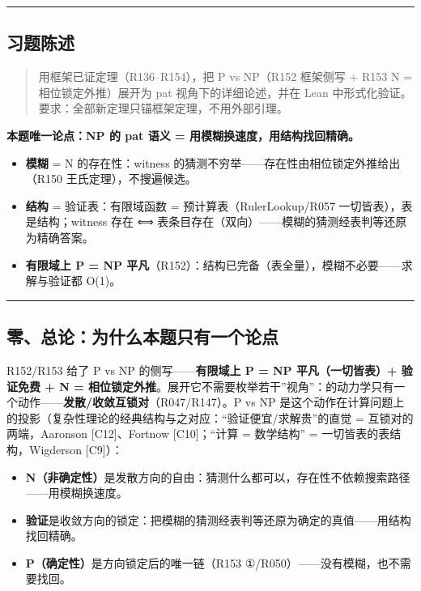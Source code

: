 \documentclass[
]{article}
\providecommand{\tightlist}{%
 \setlength{\itemsep}{0pt}\setlength{\parskip}{0pt}}
\begin{document}
\begin{center}\rule{0.5\linewidth}{0.5pt}\end{center}

\subsection{习题陈述}\label{ux4e60ux9898ux9648ux8ff0}

\begin{quote}
用框架已证定理（R136--R154），把 P vs NP（R152 框架侧写 + R153 N =
相位锁定外推）展开为 pat 视角下的详细论述，并在 Lean
中形式化验证。要求：全部新定理只锚框架定理，不用外部引理。
\end{quote}

\textbf{本题唯一论点：NP 的 pat 语义 = 用模糊换速度，用结构找回精确。}

\begin{itemize}
\tightlist
\item
 \textbf{模糊} = N 的存在性：witness
 的猜测不穷举------存在性由相位锁定外推给出（R150
 王氏定理），不搜遍候选。
\item
 \textbf{结构} = 验证表：有限域函数 = 预计算表（RulerLookup/R057
 一切皆表），表是结构；witness 存在 ⟺
 表条目存在（双向）------模糊的猜测经表判等还原为精确答案。
\item
 \textbf{有限域上 P = NP
 平凡}（R152）：结构已完备（表全量），模糊不必要------求解与验证都
 O(1)。
\end{itemize}

\begin{center}\rule{0.5\linewidth}{0.5pt}\end{center}

\subsection{零、总论：为什么本题只有一个论点}\label{ux96f6ux603bux8bbaux4e3aux4ec0ux4e48ux672cux9898ux53eaux6709ux4e00ux4e2aux8bbaux70b9}

R152/R153 给了 P vs NP 的侧写------\textbf{有限域上 P = NP
平凡（一切皆表）+ 验证免费 + N =
相位锁定外推}。展开它不需要枚举若干''视角''：的动力学只有一个动作------\textbf{发散/收敛互锁对}（R047/R147）。P
vs NP
是这个动作在计算问题上的投影（复杂性理论的经典结构与之对应：``验证便宜/求解贵''的直觉
= 互锁对的两端，Aaronson {[}C12{]}、Fortnow {[}C10{]}；``计算 =
数学结构'' = 一切皆表的表结构，Wigderson {[}C9{]}）：

\begin{itemize}
\tightlist
\item
 \textbf{N（非确定性）}是发散方向的自由：猜测什么都可以，存在性不依赖搜索路径------用模糊换速度。
\item
 \textbf{验证}是收敛方向的锁定：把模糊的猜测经表判等还原为确定的真值------用结构找回精确。
\item
 \textbf{P（确定性）}是方向锁定后的唯一链（R153
 ①/R050）------没有模糊，也不需要找回。
\end{itemize}
\end{document}
